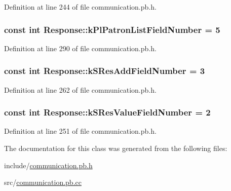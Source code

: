 Definition at line 244 of file communication.\-pb.\-h.

\hypertarget{classResponse_a12f1b77a36915a62382afe9a64be3662}{
\subsubsection[{k\-Pl\-Patron\-List\-Field\-Number}]{\setlength{\rightskip}{0pt plus 5cm}const int Response\-::k\-Pl\-Patron\-List\-Field\-Number = 5\hspace{0.3cm}{\ttfamily [static]}}}\label{classResponse_a12f1b77a36915a62382afe9a64be3662}


Definition at line 290 of file communication.\-pb.\-h.

\hypertarget{classResponse_aada2e486130a9b2e5e95702c296108d6}{
\subsubsection[{k\-S\-Res\-Add\-Field\-Number}]{\setlength{\rightskip}{0pt plus 5cm}const int Response\-::k\-S\-Res\-Add\-Field\-Number = 3\hspace{0.3cm}{\ttfamily [static]}}}\label{classResponse_aada2e486130a9b2e5e95702c296108d6}


Definition at line 262 of file communication.\-pb.\-h.

\hypertarget{classResponse_aecaa819bd2416d0df97d98a0cc6bdef4}{
\subsubsection[{k\-S\-Res\-Value\-Field\-Number}]{\setlength{\rightskip}{0pt plus 5cm}const int Response\-::k\-S\-Res\-Value\-Field\-Number = 2\hspace{0.3cm}{\ttfamily [static]}}}\label{classResponse_aecaa819bd2416d0df97d98a0cc6bdef4}


Definition at line 251 of file communication.\-pb.\-h.



The documentation for this class was generated from the following files\-:\begin{DoxyCompactItemize}
\item 
include/\hyperlink{communication_8pb_8h}{communication.\-pb.\-h}\item 
src/\hyperlink{communication_8pb_8cc}{communication.\-pb.\-cc}\end{DoxyCompactItemize}
